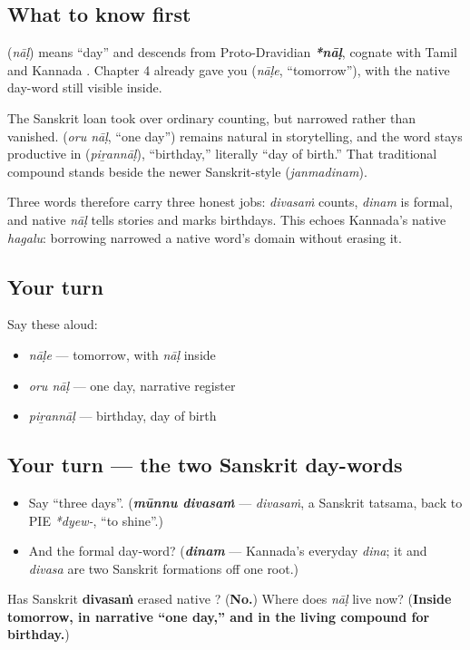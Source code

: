 \subsection*{What to know first}
\textbf{} (\emph{nāḷ}) means “day” and descends from Proto-Dravidian \emph{\textbf{*nāḷ}}, cognate with Tamil \textbf{} and Kannada \textbf{}. Chapter 4 already gave you \textbf{} (\emph{nāḷe}, “tomorrow”), with the native day-word still visible inside.

The Sanskrit loan \textbf{} took over ordinary counting, but \textbf{} narrowed rather than vanished. \textbf{ } (\emph{oru nāḷ}, “one day”) remains natural in storytelling, and the word stays productive in \textbf{} (\emph{piṟannāḷ}), “birthday,” literally “day of birth.” That traditional compound stands beside the newer Sanskrit-style \textbf{} (\emph{janmadinam}).

Three words therefore carry three honest jobs: \emph{divasaṁ} counts, \emph{dinam} is formal, and native \emph{nāḷ} tells stories and marks birthdays. This echoes Kannada’s native \emph{hagalu}: borrowing narrowed a native word’s domain without erasing it.

\subsection*{Your turn}
Say these aloud:

\begin{itemize}
\raggedright
  \item \emph{nāḷe} — tomorrow, with \emph{nāḷ} inside
  \item \emph{oru nāḷ} — one day, narrative register
  \item \emph{piṟannāḷ} — birthday, day of birth
\end{itemize}

\subsection*{Your turn — the two Sanskrit day-words}
\begin{itemize}
\raggedright
  \item Say \textquotedblleft{}three days\textquotedblright{}. (\emph{\textbf{mūnnu divasaṁ}} — \emph{divasaṁ}, a Sanskrit tatsama, back to PIE \emph{*dyew-}, \textquotedblleft{}to shine\textquotedblright{}.)
  \item And the formal day-word? (\emph{\textbf{dinam}} — Kannada's everyday \emph{dina}; it and \emph{divasa} are two Sanskrit formations off one root.)
\end{itemize}

\begin{tcolorbox}[breakable,colback=teal!4,colframe=teal!35!black,title={Before you move on}]
Has Sanskrit \textbf{divasaṁ} erased native \textbf{}? (\textbf{No.}) Where does \emph{nāḷ} live now? (\textbf{Inside tomorrow, in narrative “one day,” and in the living compound for birthday.})
\end{tcolorbox}
